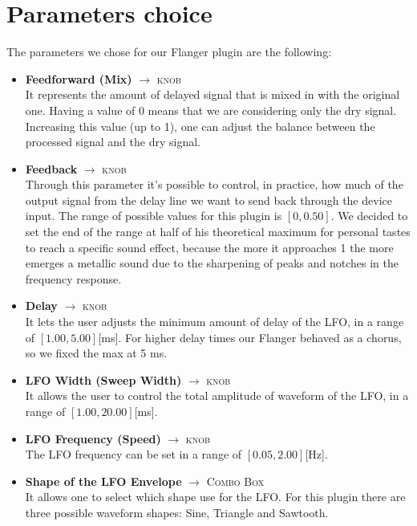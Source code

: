 \documentclass[a4paper,12pt]{report}
\begin{document}
\section{Parameters choice}
The parameters we chose for our Flanger plugin are the following:
\begin{itemize}
\item \textbf{Feedforward (Mix)} $\rightarrow$ \textsc{knob}
\\It represents the amount of delayed signal that is mixed in with the original one. Having a value of 0 means that we are considering only the dry signal. Increasing this value (up to 1), one can adjust the balance between the processed signal and the dry signal.
\item \textbf{Feedback} $\rightarrow$ \textsc{knob}
\\Through this parameter it's possible to control, in practice, how much of the output signal from the delay line we want to send back through the device input. The range of possible values for this plugin is $[0, 0.50]$. We decided to set the end of the range at half of his theoretical maximum for personal tastes to reach a specific sound effect, because the more it approaches 1 the more emerges a metallic sound due to the sharpening of peaks and notches in the frequency response.
\item \textbf{Delay} $\rightarrow$ \textsc{knob}
\\It lets the user adjusts the minimum amount of delay of the LFO, in a range of $[1.00, 5.00]$[ms]. For higher delay times our Flanger behaved as a chorus, so we fixed the max at 5 ms.
\item \textbf{LFO Width (Sweep Width)} $\rightarrow$ \textsc{knob}
\\It allows the user to control the total amplitude of waveform of the LFO, in a range of $[1.00, 20.00]$[ms].
\item \textbf{LFO Frequency (Speed)} $\rightarrow$ \textsc{knob}
\\The LFO frequency can be set in a range of $[0.05, 2.00]$[Hz].
\item \textbf{Shape of the LFO Envelope} $\rightarrow$ \textsc{Combo Box}
\\It allows one to select which shape use for the LFO. For this plugin there are three possible waveform shapes: Sine, Triangle and Sawtooth.
\end{itemize}
\end{document}
